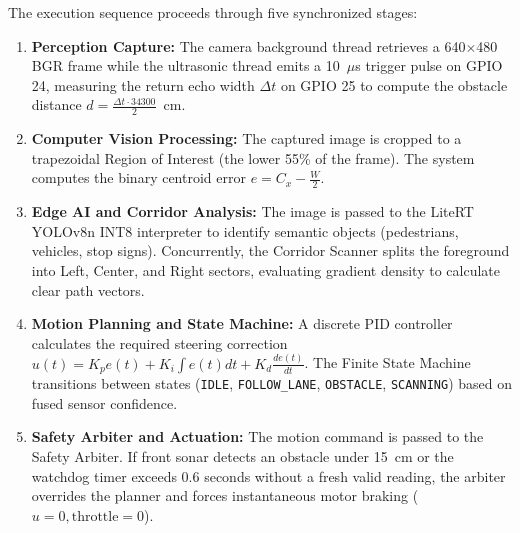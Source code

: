 The execution sequence proceeds through five synchronized stages:
\begin{enumerate}
    \item \textbf{Perception Capture:} The camera background thread retrieves a 640$\times$480 BGR frame while the ultrasonic thread emits a 10~$\mu$s trigger pulse on GPIO 24, measuring the return echo width $\Delta t$ on GPIO 25 to compute the obstacle distance $d = \frac{\Delta t \cdot 34300}{2}$~cm.
    \item \textbf{Computer Vision Processing:} The captured image is cropped to a trapezoidal Region of Interest (the lower 55\% of the frame). The system computes the binary centroid error $e = C_x - \frac{W}{2}$.
    \item \textbf{Edge AI and Corridor Analysis:} The image is passed to the LiteRT YOLOv8n INT8 interpreter to identify semantic objects (pedestrians, vehicles, stop signs). Concurrently, the Corridor Scanner splits the foreground into Left, Center, and Right sectors, evaluating gradient density to calculate clear path vectors.
    \item \textbf{Motion Planning and State Machine:} A discrete PID controller calculates the required steering correction $u(t) = K_p e(t) + K_i \int e(t) dt + K_d \frac{de(t)}{dt}$. The Finite State Machine transitions between states (\texttt{IDLE}, \texttt{FOLLOW\_LANE}, \texttt{OBSTACLE}, \texttt{SCANNING}) based on fused sensor confidence.
    \item \textbf{Safety Arbiter and Actuation:} The motion command is passed to the Safety Arbiter. If front sonar detects an obstacle under 15~cm or the watchdog timer exceeds 0.6 seconds without a fresh valid reading, the arbiter overrides the planner and forces instantaneous motor braking ($u = 0, \text{throttle} = 0$).
\end{enumerate}

